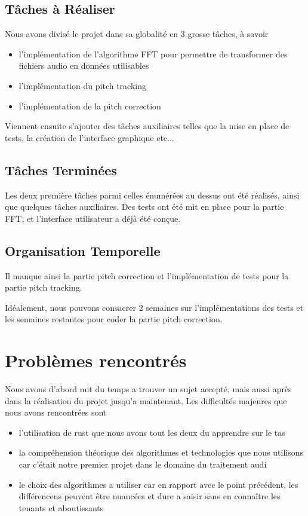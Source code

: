 \documentclass{article}
\begin{document}
\subsection{Tâches à Réaliser}

Nous avons divisé le projet dans sa globalité en 3 grosse tâches, à savoir 
\begin{itemize}
  \item l'implémentation de l'algorithme FFT pour permettre de transformer des fichiers audio en données utilisables
  \item l'implémentation du pitch tracking
  \item l'implémentation de la pitch correction
\end{itemize}

Viennent ensuite s'ajouter des tâches auxiliaires telles que la mise en place de tests, la création de l'interface graphique etc...

\subsection{Tâches Terminées}

Les deux première tâches parmi celles énumérées au dessus ont été réalisés, ainsi que quelques tâches auxiliaires. Des tests ont été mit en place pour la partie FFT, et l'interface utilisateur a déjà été conçue.

\subsection{Organisation Temporelle}

Il manque ainsi la partie pitch correction et l'implémentation de tests pour la partie pitch tracking. 
\par
Idéalement, nous pouvons consacrer 2 semaines sur l'implémentations des tests et les semaines restantes pour coder la partie pitch correction.


\section*{Problèmes rencontrés}
Nous avons d'abord mit du temps a trouver un sujet accepté, mais aussi après dans la réalisation du projet jusqu'a maintenant. Les difficultés majeures que nous avons rencontrées sont 
\begin{itemize}
   \item l'utilisation de rust que nous avons tout les deux du apprendre sur le tas
  \item la compréhension théorique des algorithmes et technologies que nous utilisons car c'était notre premier projet dans le domaine du traitement audi
  \item le choix des algorithmes a utiliser car en rapport avec le point précédent, les différencens peuvent être nuancées et dure a saisir sans en connaître les tenants et aboutissants
\end{itemize}
\end{document}

